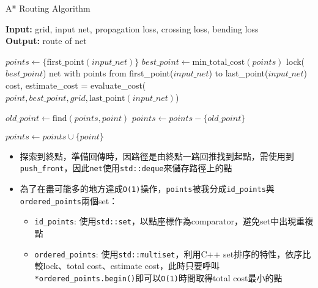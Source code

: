 \documentclass{article}
\begin{document}
\pagebreak

\begin{algorithm}
\caption{A* Routing Algorithm}
\textbf{Input:} grid, input net, propagation loss, crossing loss, bending loss \\
\textbf{Output:} route of net
\begin{algorithmic}

\State $points \gets \{\textrm{first\_point}(input\_net)\}$ 
\While{\True}
    \State $best\_point \gets \textrm{min\_total\_cost}(points)$
    \State lock($best\_point$)
     
        \State \Return net with points from \textrm{first\_point}($input\_net$) to \textrm{last\_point}($input\_net$) 
    \EndIf
     
         \Continue \EndIIf
         \Continue \EndIIf
        \State cost, estimate\_cost = evaluate\_cost($point, best\_point, grid, \textrm{last\_point}(input\_net)$)
        
            \State $old\_point \gets \textrm{find}(points, point)$
             \Continue \EndIIf {}
            \State $points \gets points - \{old\_point\}$ 
        \EndIf

        \State $points \gets points \cup \{point\}$
    \EndFor
\EndWhile

\end{algorithmic}
\end{algorithm}


\begin{itemize}
    \item 探索到終點，準備回傳時，因路徑是由終點一路回推找到起點，需使用到\texttt{push\_front}，因此\texttt{net}使用\texttt{std::deque}來儲存路徑上的點
    \item 為了在盡可能多的地方達成\texttt{O(1)}操作，\texttt{points}被我分成\texttt{id\_points}與\texttt{ordered\_points}兩個set： 
    \begin{itemize}
        \item \texttt{id\_points}: 使用\texttt{std::set}，以點座標作為comparator，避免set中出現重複點
        \item \texttt{ordered\_points}: 使用\texttt{std::multiset}，利用C++ set排序的特性，依序比較lock、total cost、estimate cost，此時只要呼叫\texttt{*ordered\_points.begin()}即可以\texttt{O(1)}時間取得total cost最小的點
    \end{itemize}
\end{itemize}
\end{document}
